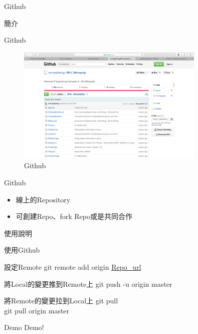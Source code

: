 \documentclass[pdf,16pt]{beamer}
\begin{document}
   \begin{section}{Github}
    \begin{subsection}{簡介}
      \begin{frame}{Github}
        \begin{figure}[h!]
          \includegraphics[width=0.8\textwidth]{images/005.png} 
          \caption{Github}
        \end{figure}
      \end{frame}
      
      \begin{frame}{Github}
        \begin{itemize}
          \item 線上的Repository
          \item 可創建Repo、fork Repo或是共同合作
        \end{itemize}
      \end{frame}
    \end{subsection}
    
    \begin{subsection}{使用說明}
      \begin{frame}{使用Github}
        \begin{block}{設定Remote}
          git remote add origin \url{Repo_url}
        \end{block}
        
        \begin{block}{將Local的變更推到Remote上}
          git push -u origin master
        \end{block}
        
        \begin{block}{將Remote的變更拉到Local上}
          git pull\\
          git pull origin master
        \end{block}
        
      \end{frame}
      
      \begin{frame}{Demo}
        Demo!
      \end{frame}
     
    \end{subsection}
    
   \end{section}
   
\end{document}
